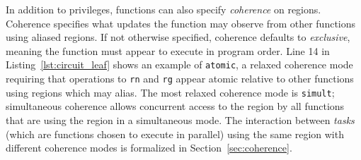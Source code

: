In addition to privileges, functions can also specify {\em coherence}
on regions.  Coherence specifies what updates the function may
observe from other functions using aliased regions.  
If not otherwise specified, coherence defaults to {\em exclusive}, 
meaning the function must appear to execute in program order.  
Line 14 in Listing~\ref{lst:circuit_leaf} shows
an example of {\tt atomic}, a relaxed coherence mode requiring
that operations to {\tt rn} and {\tt rg} appear atomic relative
to other functions using regions which may alias.  The most relaxed coherence
mode is {\tt simult}; simultaneous coherence allows concurrent access 
to the region by all functions that are using the region
in a simultaneous mode.  The interaction between {\em tasks} (which are functions chosen to execute in parallel) using the same
region with different coherence
modes is formalized in Section~\ref{sec:coherence}.


